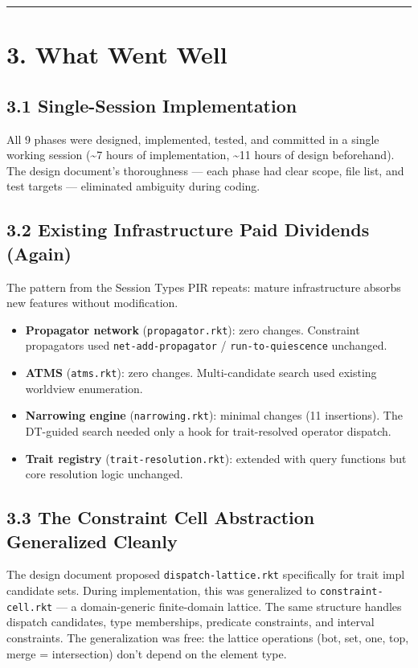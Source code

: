 \documentclass[11pt]{article}
\begin{document}
\noindent\rule{\textwidth}{0.5pt}
\section{3. What Went Well}
\label{sec:orgc8f369b}

\subsection{3.1 Single-Session Implementation}
\label{sec:org54fb54f}

All 9 phases were designed, implemented, tested, and committed in a single working
session (\textasciitilde{}7 hours of implementation, \textasciitilde{}11 hours of design beforehand). The design
document's thoroughness — each phase had clear scope, file list, and test targets —
eliminated ambiguity during coding.
\subsection{3.2 Existing Infrastructure Paid Dividends (Again)}
\label{sec:org62c4e53}

The pattern from the Session Types PIR repeats: mature infrastructure absorbs new
features without modification.

\begin{itemize}
\item \textbf{Propagator network} (\texttt{propagator.rkt}): zero changes. Constraint propagators used
\texttt{net-add-propagator} / \texttt{run-to-quiescence} unchanged.
\item \textbf{ATMS} (\texttt{atms.rkt}): zero changes. Multi-candidate search used existing worldview
enumeration.
\item \textbf{Narrowing engine} (\texttt{narrowing.rkt}): minimal changes (11 insertions). The DT-guided
search needed only a hook for trait-resolved operator dispatch.
\item \textbf{Trait registry} (\texttt{trait-resolution.rkt}): extended with query functions but core
resolution logic unchanged.
\end{itemize}
\subsection{3.3 The Constraint Cell Abstraction Generalized Cleanly}
\label{sec:org159aa8b}

The design document proposed \texttt{dispatch-lattice.rkt} specifically for trait impl
candidate sets. During implementation, this was generalized to \texttt{constraint-cell.rkt} —
a domain-generic finite-domain lattice. The same structure handles dispatch candidates,
type memberships, predicate constraints, and interval constraints. The generalization
was free: the lattice operations (bot, set, one, top, merge = intersection) don't
depend on the element type.
\end{document}
